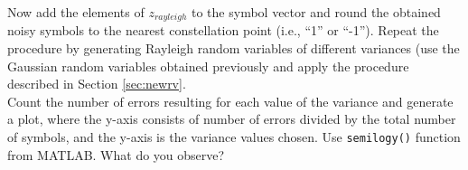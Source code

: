 \documentclass[letterpaper,12pt]{article}
\begin{document}
 Now add the elements of ${z}_{rayleigh}$ to the symbol vector and round the obtained noisy
symbols to the nearest constellation point (i.e., ``1'' or ``-1''). Repeat the procedure by
generating Rayleigh random variables of different variances (use the Gaussian random
variables obtained previously and apply the procedure described in Section \ref{sec:newrv}.\\

\noindent
Count the number of errors resulting for each value of the variance and generate a plot,
where the y-axis consists of number of errors divided by the total number of symbols,
and the y-axis is the variance values chosen. Use \texttt{semilogy()} function from MATLAB. What do you observe?

\newpage


\end{document}
